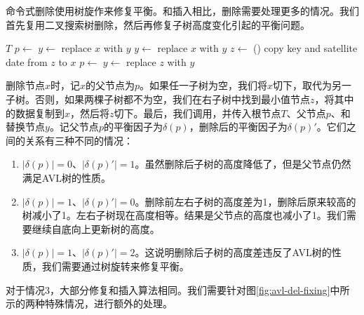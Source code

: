 \documentclass[b5paper]{ctexart}
\begin{document}
命令式删除使用树旋作来修复平衡。和插入相比，删除需要处理更多的情况。我们首先复用二叉搜索树删除，然后再修复子树高度变化引起的平衡问题。

\begin{algorithmic}[1]
    \State \Return $T$
  \EndIf
  \State $p \gets$ 
    \State $y \gets $ 
    \State replace $x$ with $y$
    \State $y \gets $ 
    \State replace $x$ with $y$
  \Else
    \State $z \gets$ ()
    \State copy key and satellite date from $z$ to $x$
    \State $p \gets$ 
    \State $y \gets$ 
    \State replace $z$ with $y$
  \EndIf
  \State \Return {}
\EndFunction
\end{algorithmic}

删除节点$x$时，记$x$的父节点为$p$。如果任一子树为空，我们将$x$切下，取代为另一子树。否则，如果两棵子树都不为空，我们在右子树中找到最小值节点$z$，将其中的数据复制到$x$，然后将$z$切下。最后，我们调用，并传入根节点$T$、父节点$p$、和替换节点$y$。记父节点$p$的平衡因子为$\delta(p)$，删除后的平衡因子为$\delta(p)'$。它们之间的关系有三种不同的情况：

\begin{enumerate}
\item $|\delta(p)| = 0$、$|\delta(p)'| = 1$。虽然删除后子树的高度降低了，但是父节点仍然满足AVL树的性质。

\item $|\delta(p)| = 1$、$|\delta(p)'| = 0$。删除前左右子树的高度差为1，删除后原来较高的树减小了1。左右子树现在高度相等。结果是父节点的高度也减小了1。我们需要继续自底向上更新树的高度。

\item $|\delta(p)| = 1$、$|\delta(p)'| = 2$。这说明删除后子树的高度差违反了AVL树的性质，我们需要通过树旋转来修复平衡。
\end{enumerate}

对于情况3，大部分修复和插入算法相同。我们需要针对图\ref{fig:avl-del-fixing}中所示的两种特殊情况，进行额外的处理。
\end{document}
